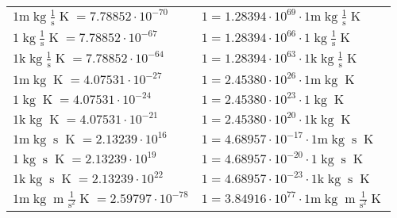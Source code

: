 \begin{center}
\begin{longtable}{l l}
{\color{gray}$1 \bm{\mathrm{ m}}\operatorname{kg}{}\frac1{\operatorname{s}}{}{\operatorname{K}} = 7.78852\cdot10^{-70} $}   & {\color{gray}$ 1 = 1.28394\cdot10^{69} \cdot 1 \bm{\mathrm{ m}}\operatorname{kg}{}\frac1{\operatorname{s}}{}{\operatorname{K}}$}  \\
{\color{black}$1 \bm{\mathrm{ }}\operatorname{kg}{}\frac1{\operatorname{s}}{}{\operatorname{K}} = 7.78852\cdot10^{-67} $}   & {\color{black}$ 1 = 1.28394\cdot10^{66} \cdot 1 \bm{\mathrm{ }}\operatorname{kg}{}\frac1{\operatorname{s}}{}{\operatorname{K}}$}  \\
{\color{gray}$1 \bm{\mathrm{ k}}\operatorname{kg}{}\frac1{\operatorname{s}}{}{\operatorname{K}} = 7.78852\cdot10^{-64} $}   & {\color{gray}$ 1 = 1.28394\cdot10^{63} \cdot 1 \bm{\mathrm{ k}}\operatorname{kg}{}\frac1{\operatorname{s}}{}{\operatorname{K}}$}  \\
{\color{gray}$1 \bm{\mathrm{ m}}\operatorname{kg}{}{}{}{\operatorname{K}} = 4.07531\cdot10^{-27} $}   & {\color{gray}$ 1 = 2.45380\cdot10^{26} \cdot 1 \bm{\mathrm{ m}}\operatorname{kg}{}{}{}{\operatorname{K}}$}  \\
{\color{black}$1 \bm{\mathrm{ }}\operatorname{kg}{}{}{}{\operatorname{K}} = 4.07531\cdot10^{-24} $}   & {\color{black}$ 1 = 2.45380\cdot10^{23} \cdot 1 \bm{\mathrm{ }}\operatorname{kg}{}{}{}{\operatorname{K}}$}  \\
{\color{gray}$1 \bm{\mathrm{ k}}\operatorname{kg}{}{}{}{\operatorname{K}} = 4.07531\cdot10^{-21} $}   & {\color{gray}$ 1 = 2.45380\cdot10^{20} \cdot 1 \bm{\mathrm{ k}}\operatorname{kg}{}{}{}{\operatorname{K}}$}  \\
{\color{gray}$1 \bm{\mathrm{ m}}\operatorname{kg}{}{\operatorname{s}}{}{\operatorname{K}} = 2.13239\cdot10^{16} $}   & {\color{gray}$ 1 = 4.68957\cdot10^{-17} \cdot 1 \bm{\mathrm{ m}}\operatorname{kg}{}{\operatorname{s}}{}{\operatorname{K}}$}  \\
{\color{black}$1 \bm{\mathrm{ }}\operatorname{kg}{}{\operatorname{s}}{}{\operatorname{K}} = 2.13239\cdot10^{19} $}   & {\color{black}$ 1 = 4.68957\cdot10^{-20} \cdot 1 \bm{\mathrm{ }}\operatorname{kg}{}{\operatorname{s}}{}{\operatorname{K}}$}  \\
{\color{gray}$1 \bm{\mathrm{ k}}\operatorname{kg}{}{\operatorname{s}}{}{\operatorname{K}} = 2.13239\cdot10^{22} $}   & {\color{gray}$ 1 = 4.68957\cdot10^{-23} \cdot 1 \bm{\mathrm{ k}}\operatorname{kg}{}{\operatorname{s}}{}{\operatorname{K}}$}  \\
{\color{gray}$1 \bm{\mathrm{ m}}\operatorname{kg}{\operatorname{m}}\frac1{\operatorname{s}^2}{}{\operatorname{K}} = 2.59797\cdot10^{-78} $}   & {\color{gray}$ 1 = 3.84916\cdot10^{77} \cdot 1 \bm{\mathrm{ m}}\operatorname{kg}{\operatorname{m}}\frac1{\operatorname{s}^2}{}{\operatorname{K}}$}  \\

\end{longtable}
\end{center}
